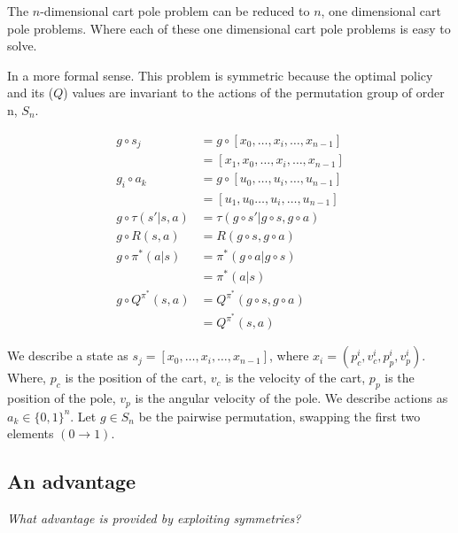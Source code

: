 The $n$-dimensional cart pole problem can be reduced to $n$, one dimensional cart pole problems.
Where each of these one dimensional cart pole problems is easy to solve.

In a more formal sense. This problem is symmetric because the optimal policy and its ($Q$) values are invariant to the actions of the permutation group of order n, $S_n$.

\begin{align*}
g \circ s_j &= g \circ [x_0, \dots, x_i, \dots, x_{n-1}] \\
&= [x_1, x_0, \dots, x_i, \dots, x_{n-1}] \\
g_i \circ a_k &= g \circ [u_0, \dots, u_i, \dots, u_{n-1}] \\
&= [u_1, u_0 \dots, u_i, \dots, u_{n-1}] \\
g\circ \tau(s'|s, a) &= \tau(g\circ s'|g\circ s, g\circ a) \\
g\circ R(s, a) &= R(g\circ s, g\circ a) \\
g\circ \pi^{* }(a|s) &= \pi^{* }(g\circ a| g\circ s) \\
&= \pi^{* }(a|s) \tag{invariance of the optimal policy}\\
g\circ Q^{\pi^{* }}(s, a) &= Q^{\pi^{* }}(g\circ s, g\circ a) \\
&= Q^{\pi^{* }}(s, a) \tag{invariance of the optimal values}
\end{align*}

We describe a state as $s_j = [x_0, \dots, x_i, \dots, x_{n-1}]$, where $x_i = (p_c^i, v_c^i, p_p^i, v_p^i)$. Where, $p_c$ is the position of the cart, $v_c$ is the velocity of the cart, $p_p$ is the position of the pole, $v_p$ is the angular velocity of the pole. We describe actions as $a_k \in \{0, 1\}^n$. Let $g\in S_n$ be the pairwise permutation, swapping the first two elements $(0\to 1)$.



\subsection{An advantage}

\begin{displayquote}
\textit{What advantage is provided by exploiting symmetries?}
\end{displayquote}

